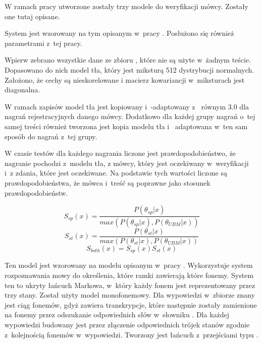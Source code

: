 W ramach pracy utworzone zostały trzy modele do weryfikacji mówcy. Zostały one tutaj opisane.

\label{sec:gmm_ubm}

System  jest wzorowany na tym opisanym w~pracy \cite{utteranceVerificationFor}. Posłużono
się również parametrami z~tej pracy.

Wpierw zebrano wszystkie dane ze zbioru , które nie są użyte w~żadnym teście. Dopasowano
do nich model tła, który jest miksturą 512 dystrybucji normalnych. Założono, że cechy są nieskorelowane
i macierz kowariancji w~miksturach jest diagonalna.

W ramach zapisów model tła jest kopiowany i~-adaptowany z~ równym $3.0$
dla nagrań rejestracyjnych danego mówcy. Dodatkowo dla każdej grupy nagrań o~tej samej treści również tworzona
jest kopia modelu tła i~ adaptowana w~ten sam sposób do nagrań z~tej grupy.

W czasie testów dla każdego nagrania liczone jest prawdopodobieństwo, że nagranie pochodzi z~modelu tła,
z  mówcy, który jest oczekiwany w~weryfikacji i~z  zdania, które jest oczekiwane.
Na podstawie tych wartości liczone są prawdopodobieństwa, że mówca i~treść są poprawne jako stosunek prawdopodobieństw.

$$S_{sp}(x) = \frac{P(\theta_{sp} | x)}{max(P(\theta_{sp} | x), P(\theta_{UBM} | x))}$$
$$S_{st}(x) = \frac{P(\theta_{st} | x)}{max(P(\theta_{st} | x), P(\theta_{UBM} | x))}$$
$$S_{both}(x) = S_{sp}(x) S_{st}(x)$$

\label{sec:hmm_gmm}

Ten model jest wzorowany na modelu opisanym w~pracy \cite{comparisonOfMultiple}. Wykorzystuje
system rozpoznawania mowy do określenia, które ramki zawierają które fonemy. System ten
to ukryty łańcuch Markowa, w~który każdy fonem jest reprezentowany przez trzy stany. Został
użyty model monofonemowy. Dla wypowiedzi w~zbiorze znany jest ciąg fonemów, gdyż
 zawiera transkrypcje, które następnie zostały zamienione na fonemy
przez odszukanie odpowiednich słów w~słowniku . Dla każdej wypowiedzi
budowany jest  przez złączenie odpowiednich trójek stanów zgodnie z~kolejnością
fonemów w~wypowiedzi. Tworzony jest łańcuch z~przejściami typu .

